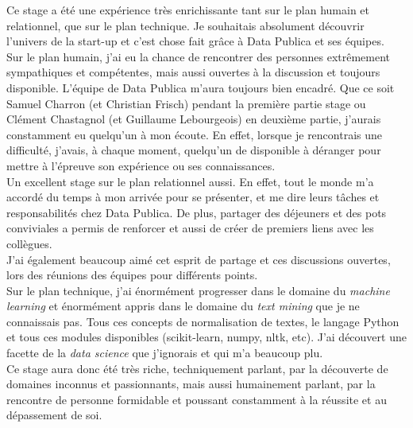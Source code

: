 Ce stage a été une expérience très enrichissante tant sur le plan humain et relationnel, que sur le plan technique. Je souhaitais absolument découvrir l'univers de la start-up et c'est chose fait grâce à Data Publica et ses équipes.\\

Sur le plan humain, j'ai eu la chance de rencontrer des personnes extrêmement sympathiques et compétentes, mais aussi ouvertes à la discussion et toujours disponible. L'équipe de Data Publica m'aura toujours bien encadré. Que ce soit Samuel Charron (et Christian Frisch) pendant la première partie stage ou Clément Chastagnol (et Guillaume Lebourgeois) en deuxième partie, j'aurais constamment eu quelqu'un à mon écoute. En effet, lorsque je rencontrais une difficulté, j'avais, à chaque moment, quelqu'un de disponible à \og déranger \fg pour mettre à l'épreuve son expérience ou ses connaissances.\\

Un excellent stage sur le plan relationnel aussi. En effet, tout le monde m'a accordé du temps à mon arrivée pour se présenter, et me dire leurs tâches et responsabilités chez Data Publica. De plus, partager des déjeuners et des pots conviviales a permis de renforcer et aussi de créer de premiers liens avec les collègues.\\

J'ai également beaucoup aimé cet esprit de partage et ces discussions ouvertes, lors des réunions des équipes pour différents points.\\

Sur le plan technique, j'ai énormément progresser dans le domaine du \textit{machine learning} et énormément appris dans le domaine du \textit{text mining} que je ne connaissais pas. Tous ces concepts de normalisation de textes, le langage Python et tous ces modules disponibles (scikit-learn, numpy, nltk, etc). J'ai découvert une facette de la \textit{data science} que j'ignorais et qui m'a beaucoup plu.\\

Ce stage aura donc été très riche, techniquement parlant, par la découverte de domaines inconnus et passionnants, mais aussi humainement parlant, par la rencontre de personne formidable et poussant constamment à la réussite et au dépassement de soi.

